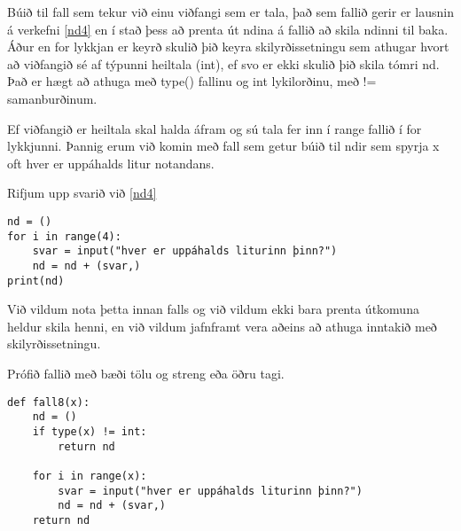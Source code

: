 \begin{exercise}\label{fun8}
Búið til fall sem tekur við einu viðfangi sem er tala, það sem fallið gerir er lausnin á verkefni \ref{nd4} en í stað þess að prenta út ndina á fallið að skila ndinni til baka.
Áður en for lykkjan er keyrð skulið þið keyra skilyrðissetningu sem athugar hvort að viðfangið sé af týpunni heiltala (int), ef svo er ekki skulið þið skila tómri nd.
Það er hægt að athuga með type() fallinu og int lykilorðinu, með != samanburðinum.

Ef viðfangið er heiltala skal halda áfram og sú tala fer inn í range fallið í for lykkjunni.
Þannig erum við komin með fall sem getur búið til ndir sem spyrja x oft hver er uppáhalds litur notandans.
\end{exercise}
\begin{Answer}[ref={fun8}]
Rifjum upp svarið við \ref{nd4}
\begin{lstlisting}
nd = ()
for i in range(4):
	svar = input("hver er uppáhalds liturinn þinn?")
	nd = nd + (svar,)
print(nd)\end{lstlisting}

Við vildum nota þetta innan falls og við vildum ekki bara prenta útkomuna heldur skila henni, en við vildum jafnframt vera aðeins að athuga inntakið með skilyrðissetningu.

Prófið fallið með bæði tölu og streng eða öðru tagi.

\begin{lstlisting}
def fall8(x):
	nd = ()
	if type(x) != int:
		return nd

	for i in range(x):
		svar = input("hver er uppáhalds liturinn þinn?")
		nd = nd + (svar,)
	return nd\end{lstlisting}
\end{Answer}

